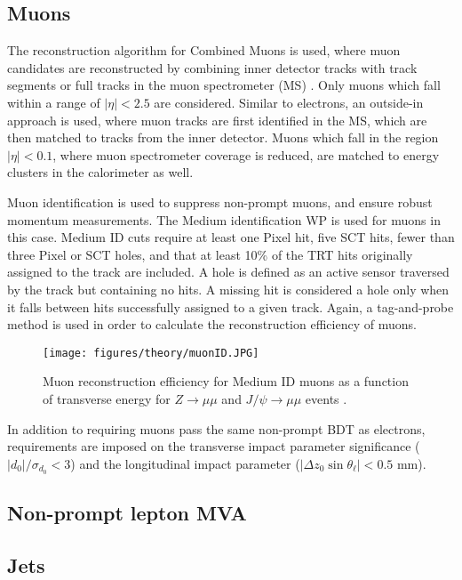 \subsection{Muons}
\label{obj:muon}
                   
The reconstruction algorithm for Combined Muons is used, where muon candidates are reconstructed by combining inner detector tracks with track segments or full tracks in the muon spectrometer (MS) \cite{PERF-2014-05}. Only muons which fall within a range of $|\eta| < 2.5$ are considered. Similar to electrons, an outside-in approach is used, where muon tracks are first identified in the MS, which are then matched to tracks from the inner detector. Muons which fall in the region $|\eta| < 0.1$, where muon spectrometer coverage is reduced, are matched to energy clusters in the calorimeter as well.

Muon identification is used to suppress non-prompt muons, and ensure robust momentum measurements. The Medium identification WP is used for muons in this case. Medium ID cuts require at least one Pixel hit, five SCT hits, fewer than three Pixel or SCT holes, and that at least 10\% of the TRT hits originally assigned to the track are included. A hole is defined as an active sensor traversed by the track but containing no hits. A missing hit is considered a hole only when it falls between hits successfully assigned to a given track. Again, a tag-and-probe method is used in order to calculate the reconstruction efficiency of muons.

\begin{figure}[H]
\centering
   \texttt{[image: figures/theory/muonID.JPG]}
\caption{Muon reconstruction efficiency for Medium ID muons as a function of transverse energy for $Z\rightarrow \mu\mu$ and $J/\psi\rightarrow\mu\mu$ events \cite{PERF-2014-05}.}
\label{fig:eEffEt}
\end{figure}

In addition to requiring muons pass the same non-prompt BDT as electrons, requirements are imposed on the transverse impact parameter significance ($|d_0|/\sigma_{d_0}<3$) and the longitudinal impact parameter ($|\Delta z_0 \sin \theta_\ell|<0.5$ mm).
 
\subsection{Non-prompt lepton MVA}
\label{sec:lepMVA}


\subsection{Jets}
\label{subsec:jets}

